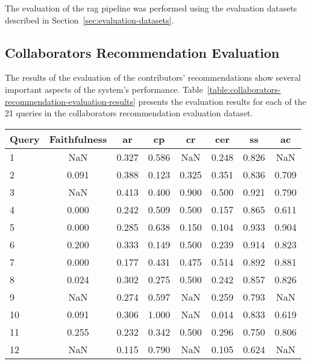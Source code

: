 The evaluation of the \gls{rag} pipeline was performed using the evaluation datasets described in Section~\ref{sec:evaluation-datasets}.

\subsection*{Collaborators Recommendation Evaluation}\label{subsec:collaborators-recommendation-evaluation}
The results of the evaluation of the contributors' recommendations show several important aspects of the system's performance.
Table~\ref{table:collaborators-recommendation-evaluation-results} presents the evaluation results for each of the 21 queries in the collaborators recommendation evaluation dataset.

\begin{table}[htbp]
    \centering
    \begin{tabularx}{\textwidth}{|X|c|c|c|c|c|c|c|}
      \hline
      \textbf{Query} & \textbf{Faithfulness} & \textbf{\gls{ar}} & \textbf{\gls{cp}} & \textbf{\gls{cr}} & \textbf{\gls{cer}} & \textbf{\gls{ss}} & \textbf{\gls{ac}} \\
        \hline
        1 & NaN & 0.327 & 0.586 & NaN & 0.248 & 0.826 & NaN \\
        \hline
        2 & 0.091 & 0.388 & 0.123 & 0.325 & 0.351 & 0.836 & 0.709 \\
        \hline
        3 & NaN & 0.413 & 0.400 & 0.900 & 0.500 & 0.921 & 0.790 \\
        \hline
        4 & 0.000 & 0.242 & 0.509 & 0.500 & 0.157 & 0.865 & 0.611 \\
        \hline
        5 & 0.000 & 0.285 & 0.638 & 0.150 & 0.104 & 0.933 & 0.904 \\
        \hline
        6 & 0.200 & 0.333 & 0.149 & 0.500 & 0.239 & 0.914 & 0.823 \\
        \hline
        7 & 0.000 & 0.177 & 0.431 & 0.475 & 0.514 & 0.892 & 0.881 \\
        \hline
        8 & 0.024 & 0.302 & 0.275 & 0.500 & 0.242 & 0.857 & 0.826 \\
        \hline
        9 &  NaN & 0.274 & 0.597 & NaN & 0.259 & 0.793 & NaN \\
        \hline
        10 & 0.091 & 0.306 & 1.000 & NaN & 0.014 & 0.833 & 0.619 \\
        \hline
        11 & 0.255 & 0.232 & 0.342 & 0.500 & 0.296 & 0.750 & 0.806 \\
        \hline
        12 & NaN & 0.115 & 0.790 & NaN & 0.105 & 0.624 & NaN \\

\end{tabularx}
\end{table}

